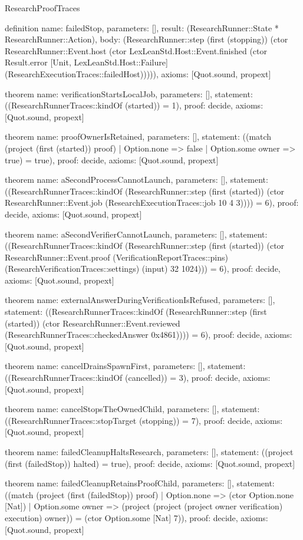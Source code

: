 \begin{lexlean}{ResearchProofTraces}
\begin{semanticmodule}
definition{
 name: failedStop,
 parameters: [],
 result: (ResearchRunner::State * ResearchRunner::Action),
 body: (ResearchRunner::step (first (stopping)) (ctor ResearchRunner::Event.host (ctor LexLeanStd.Host::Event.finished (ctor Result.error [Unit, LexLeanStd.Host::Failure] (ResearchExecutionTraces::failedHost))))),
 axioms: [Quot.sound, propext]
}

theorem{
 name: verificationStartsLocalJob,
 parameters: [],
 statement: ((ResearchRunnerTraces::kindOf (started)) = 1),
 proof: decide{},
 axioms: [Quot.sound, propext]
}

theorem{
 name: proofOwnerIsRetained,
 parameters: [],
 statement: ((match (project (first (started)) proof) | Option.none => false | Option.some owner => true) = true),
 proof: decide{},
 axioms: [Quot.sound, propext]
}

theorem{
 name: aSecondProcessCannotLaunch,
 parameters: [],
 statement: ((ResearchRunnerTraces::kindOf (ResearchRunner::step (first (started)) (ctor ResearchRunner::Event.job (ResearchExecutionTraces::job 10 4 3)))) = 6),
 proof: decide{},
 axioms: [Quot.sound, propext]
}

theorem{
 name: aSecondVerifierCannotLaunch,
 parameters: [],
 statement: ((ResearchRunnerTraces::kindOf (ResearchRunner::step (first (started)) (ctor ResearchRunner::Event.proof (VerificationReportTraces::pins) (ResearchVerificationTraces::settings) (input) 32 1024))) = 6),
 proof: decide{},
 axioms: [Quot.sound, propext]
}

theorem{
 name: externalAnswerDuringVerificationIsRefused,
 parameters: [],
 statement: ((ResearchRunnerTraces::kindOf (ResearchRunner::step (first (started)) (ctor ResearchRunner::Event.reviewed (ResearchRunnerTraces::checkedAnswer 0x4861)))) = 6),
 proof: decide{},
 axioms: [Quot.sound, propext]
}

theorem{
 name: cancelDrainsSpawnFirst,
 parameters: [],
 statement: ((ResearchRunnerTraces::kindOf (cancelled)) = 3),
 proof: decide{},
 axioms: [Quot.sound, propext]
}

theorem{
 name: cancelStopsTheOwnedChild,
 parameters: [],
 statement: ((ResearchRunnerTraces::stopTarget (stopping)) = 7),
 proof: decide{},
 axioms: [Quot.sound, propext]
}

theorem{
 name: failedCleanupHaltsResearch,
 parameters: [],
 statement: ((project (first (failedStop)) halted) = true),
 proof: decide{},
 axioms: [Quot.sound, propext]
}

theorem{
 name: failedCleanupRetainsProofChild,
 parameters: [],
 statement: ((match (project (first (failedStop)) proof) | Option.none => (ctor Option.none [Nat]) | Option.some owner => (project (project (project owner verification) execution) owner)) = (ctor Option.some [Nat] 7)),
 proof: decide{},
 axioms: [Quot.sound, propext]
}


\end{semanticmodule}
\end{lexlean}

